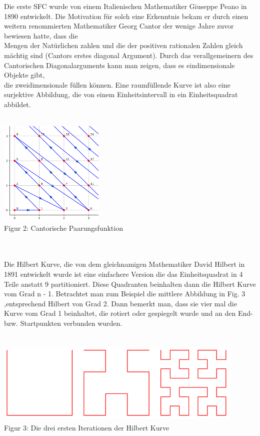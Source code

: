 \documentclass[course=erap]{aspdoc}
\begin{document}
Die erste SFC wurde von einem Italienischen Mathematiker Giuseppe Peano in 1890 entwickelt. 
\newpage
Die Motivation für solch eine Erkenntnis bekam er durch einen weitern  renommierten Mathematiker Georg Cantor der wenige Jahre zuvor bewiesen hatte, dass die \\ Mengen der Natürlichen zahlen und die der positiven rationalen Zahlen gleich mächtig sind (Cantors erstes diagonal Argument). 
Durch das verallgemeinern des Cantorischen Diagonalarguments kann man zeigen, dass es eindimensionale Objekte gibt, \\ die zweidimensionale füllen können. Eine raumfüllende Kurve ist also eine surjektive Abbildung, die von einem Einheitsintervall in ein Einheitsquadrat abbildet.
\\
\\
\begin{center}
    \includegraphics[width=5cm, height=5cm]{Cantor}\\   %
    \tiny Figur 2: Cantorische Paarungsfunktion
\end{center}
\   \\
\\
Die Hilbert Kurve, die von dem gleichnamigen Mathematiker David Hilbert in 1891 entwickelt wurde ist eine einfachere Version die das Einheitsquadrat in 4 Teile anstatt 9 partitioniert. Diese Quadranten beinhalten dann die Hilbert Kurve vom Grad n - 1. Betrachtet man zum Beispiel die mittlere Abbildung in Fig. 3 ,entsprechend Hilbert von Grad 2. Dann bemerkt man, dass sie vier mal die Kurve vom Grad 1 beinhaltet, die rotiert oder gespiegelt wurde und an den End- bzw. Startpunkten verbunden wurden.
\\
\\
\begin{center}
    \includegraphics[width=12cm, height=4cm]{Hilbert}\\ %
    \tiny Figur 3: Die drei ersten Iterationen der Hilbert Kurve
\end{center}
\end{document}
